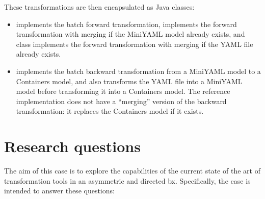 \documentclass[twocolumn]{ceurart}
\begin{document}
These transformations are then encapsulated as Java classes:

\begin{itemize}
\item {} implements the batch forward
  transformation,  implements the forward
  transformation with merging if the MiniYAML model already exists, and
   class implements the forward
  transformation with merging if the YAML file already exists.

\item {} implements the batch backward
  transformation from a MiniYAML model to a Containers model, and
   also transforms the YAML file into a MiniYAML
  model before transforming it into a Containers model. The reference
  implementation does not have a ``merging'' version of the backward
  transformation: it replaces the Containers model if it exists.

\end{itemize}

\section{Research questions}

The aim of this case is to explore the capabilities of the current state of the
art of transformation tools in an asymmetric and directed bx. Specifically, the
case is intended to answer these questions:
\end{document}
